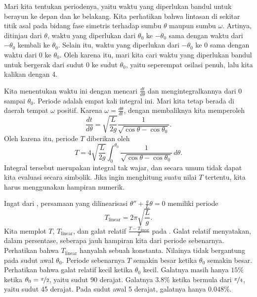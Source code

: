 Mari kita tentukan periodenya, yaitu waktu yang diperlukan bandul untuk
berayun ke depan dan ke belakang.
Kita perhatikan bahwa lintasan di sekitar titik asal pada bidang fase
simetris terhadap sumbu $\theta$ maupun sumbu $\omega$. Artinya, ditinjau
dari $\theta$, waktu yang diperlukan dari $\theta_0$ ke $-\theta_0$ sama
dengan waktu dari $-\theta_0$ kembali ke $\theta_0$. Selain itu, waktu yang
diperlukan dari $-\theta_0$ ke $0$ sama dengan waktu dari $0$ ke
$\theta_0$. Oleh karena itu, mari kita cari waktu yang diperlukan bandul
untuk bergerak dari sudut 0 ke sudut $\theta_0$, yaitu seperempat osilasi
penuh, lalu kita kalikan dengan 4.

Kita menentukan waktu ini dengan mencari
$\frac{dt}{d\theta}$ dan mengintegralkannya dari $0$ sampai $\theta_0$.
Periode adalah empat kali integral ini. Mari kita tetap berada di daerah
tempat $\omega$ positif. Karena $\omega = \frac{d\theta}{dt}$, dengan
membaliknya kita memperoleh
\begin{equation*}
\frac{dt}{d\theta} = \sqrt{\frac{L}{2g}} \frac{1}{\sqrt{\cos \theta - \cos \theta_0 }} .
\end{equation*}
Oleh karena itu, periode $T$ diberikan oleh
\begin{equation*}
T = 4 \sqrt{\frac{L}{2g}} \int_0^{\theta_0} \frac{1}{\sqrt{\cos \theta -
\cos \theta_0 }}\, d\theta .
\end{equation*}
Integral tersebut merupakan integral tak wajar, dan secara umum tidak dapat
kita evaluasi secara simbolik. Jika ingin menghitung suatu nilai $T$
tertentu, kita harus menggunakan hampiran numerik.

Ingat dari , persamaan yang dilinearisasi
$\theta''+\frac{g}{L}\theta = 0$ memiliki periode
\begin{equation*}
T_{\text{linear}} = 2\pi \sqrt{\frac{L}{g}} .
\end{equation*}
Kita memplot $T$, $T_{\text{linear}}$, dan galat relatif
$\frac{T-T_{\text{linear}}}{T}$ pada . Galat relatif
menyatakan, dalam persentase, seberapa jauh hampiran kita dari periode
sebenarnya. Perhatikan bahwa $T_{\text{linear}}$ hanyalah sebuah konstanta.
Nilainya tidak bergantung pada sudut awal $\theta_0$. Periode sebenarnya $T$
semakin besar ketika $\theta_0$ semakin besar.
Perhatikan bahwa galat relatif kecil ketika $\theta_0$ kecil. Galatnya masih
hanya $15\%$ ketika $\theta_0 = \nicefrac{\pi}{2}$, yaitu sudut 90 derajat.
Galatnya $3.8\%$ ketika bermula dari $\nicefrac{\pi}{4}$, yaitu sudut
45 derajat. Pada sudut awal 5 derajat, galatnya hanya $0.048 \%$.

